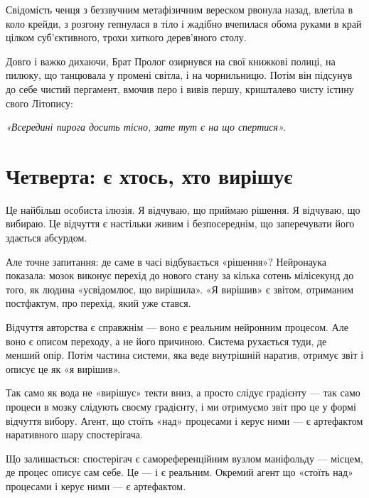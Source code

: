 \documentclass[12pt, a4paper, openany]{book}
\begin{document}
\begin{terrybox}
Свідомість ченця з беззвучним метафізичним вереском рвонула назад, влетіла в коло крейди, з розгону гепнулася в тіло і жадібно вчепилася обома руками в край цілком суб'єктивного, трохи хиткого дерев'яного столу.

Довго і важко дихаючи, Брат Пролог озирнувся на свої книжкові полиці, на пилюку, що танцювала у промені світла, і на чорнильницю. Потім він підсунув до себе чистий пергамент, вмочив перо і вивів першу, кришталево чисту істину свого Літопису:

\medskip
\begin{center}\textit{«Всередині пирога досить тісно, зате тут є на що спертися».}\end{center}
\end{terrybox}

\section{Четверта: є хтось, хто вирішує}

Це найбільш особиста ілюзія. Я відчуваю, що приймаю рішення. Я відчуваю, що вибираю. Це відчуття є настільки живим і безпосереднім, що заперечувати його здається абсурдом.

Але точне запитання: де саме в часі відбувається «рішення»? Нейронаука показала: мозок виконує перехід до нового стану за кілька сотень мілісекунд до того, як людина «усвідомлює, що вирішила». «Я вирішив» є звітом, отриманим постфактум, про перехід, який уже стався.

Відчуття авторства є справжнім --- воно є реальним нейронним процесом. Але воно є описом переходу, а не його причиною. Система рухається туди, де менший опір. Потім частина системи, яка веде внутрішній наратив, отримує звіт і описує це як «я вирішив».

Так само як вода не «вирішує» текти вниз, а просто слідує градієнту --- так само процеси в мозку слідують своєму градієнту, і ми отримуємо звіт про це у формі відчуття вибору. Агент, що стоїть «над» процесами і керує ними --- є артефактом наративного шару спостерігача.

Що залишається: спостерігач є самореференційним вузлом маніфольду --- місцем, де процес описує сам себе. Це — і є реальним. Окремий агент що «стоїть над» процесами і керує ними --- є артефактом.
\end{document}
